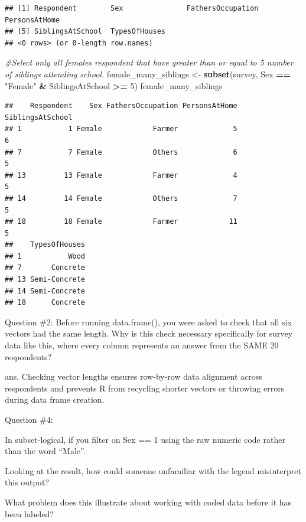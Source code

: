 \documentclass[
]{article}
\newenvironment{Shaded}{\begin{snugshade}}{\end{snugshade}}
\newcommand{\CommentTok}[1]{\textcolor[rgb]{0.56,0.35,0.01}{\textit{#1}}}
\newcommand{\DecValTok}[1]{\textcolor[rgb]{0.00,0.00,0.81}{#1}}
\newcommand{\FunctionTok}[1]{\textcolor[rgb]{0.13,0.29,0.53}{\textbf{#1}}}
\newcommand{\NormalTok}[1]{#1}
\newcommand{\OtherTok}[1]{\textcolor[rgb]{0.56,0.35,0.01}{#1}}
\newcommand{\SpecialCharTok}[1]{\textcolor[rgb]{0.81,0.36,0.00}{\textbf{#1}}}
\newcommand{\StringTok}[1]{\textcolor[rgb]{0.31,0.60,0.02}{#1}}
\begin{document}
\begin{verbatim}
## [1] Respondent        Sex               FathersOccupation PersonsAtHome    
## [5] SiblingsAtSchool  TypesOfHouses    
## <0 rows> (or 0-length row.names)
\end{verbatim}

\begin{Shaded}
\begin{Highlighting}[]
\CommentTok{\#Select only all females respondent that have greater than or equal to 5 number of siblings attending school.}
\NormalTok{female\_many\_siblings }\OtherTok{\textless{}{-}} \FunctionTok{subset}\NormalTok{(survey, Sex }\SpecialCharTok{==} \StringTok{"Female"} \SpecialCharTok{\&}\NormalTok{ SiblingsAtSchool }\SpecialCharTok{\textgreater{}=} \DecValTok{5}\NormalTok{)}
\NormalTok{female\_many\_siblings}
\end{Highlighting}
\end{Shaded}

\begin{verbatim}
##    Respondent    Sex FathersOccupation PersonsAtHome SiblingsAtSchool
## 1           1 Female            Farmer             5                6
## 7           7 Female            Others             6                5
## 13         13 Female            Farmer             4                5
## 14         14 Female            Others             7                5
## 18         18 Female            Farmer            11                5
##    TypesOfHouses
## 1           Wood
## 7       Concrete
## 13 Semi-Concrete
## 14 Semi-Concrete
## 18      Concrete
\end{verbatim}

Question \#2: Before running data.frame(), you were asked to check that
all six vectors had the same length. Why is this check necessary
specifically for survey data like this, where every column represents an
answer from the SAME 20 respondents?

ans. Checking vector lengths ensures row-by-row data alignment across
respondents and prevents R from recycling shorter vectors or throwing
errors during data frame creation.

Question \#4:

In subset-logical, if you filter on Sex == 1 using the raw numeric code
rather than the word ``Male''.

Looking at the result, how could someone unfamiliar with the legend
misinterpret this output?

What problem does this illustrate about working with coded data before
it has been labeled?
\end{document}
